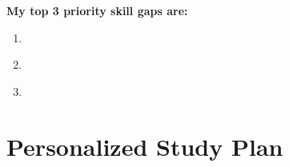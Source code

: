 \documentclass[11pt,letterpaper]{article}
\newcommand{\blank}[1][3cm]{\underline{\hspace{#1}}}
\begin{document}
\begin{gapbox}
\vspace{0.4cm}

\textbf{My top 3 priority skill gaps are:}
\begin{enumerate}
  \item \blank[10cm]
  \item \blank[10cm]
  \item \blank[10cm]
\end{enumerate}

\end{gapbox}

\newpage

\section{Personalized Study Plan}
\end{document}
